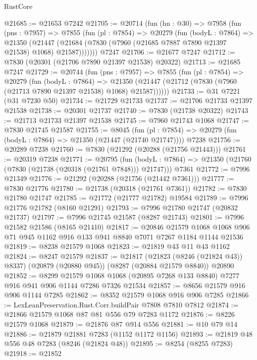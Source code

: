 \begin{lexlean}{RustCore}
\begin{coremodule}
@21685 := @21653 @7242
@21705 := @20714
    (fun (hn : @30) =>
    @7958
      (fun (pns : @7957) =>
      @7855
        (fun (pl : @7854) =>
        @20279
          (fun (bodyL : @7864) =>
          @21350
            (@21447 (@21684 (@7830 (@7960 (@21685 @7887 @7890 @21397 @21538) @1068) @21587)))))))
    @7247
@21706 := @21677 @7247
@21712 := @7830 (@20301 (@21706 @7890 @21397 @21538) @20322)
@21713 := @21685 @7247
@21729 := @20744
    (fun (pns : @7957) =>
    @7855
      (fun (pl : @7854) =>
      @20279
        (fun (bodyL : @7864) =>
        @21350 (@21447 (@21712 (@7830 (@7960 (@21713 @7890 @21397 @21538) @1068) @21587))))))
@21733 := @31 @7221 (@31 @7230 @50)
@21734 := @21729 @21733
@21737 := @21706 @21733 @21397 @21538
@21738 := @20301 @21737
@21740 := @7830 (@21738 @20322)
@21743 := @21713 @21733 @21397 @21538
@21745 := @7960 @21743 @1068
@21747 := @7830 @21745 @21587
@21755 := @8045
    (fun (pl : @7854) => @20279 (fun (bodyL : @7864) => @21350 (@21447 (@21740 @21747))))
    @7238
@21756 := @20289 @7238
@21760 := @7830 (@21292 (@20288 (@21756 @21443)))
@21761 := @20319 @7238
@21771 := @20795
    (fun (bodyL : @7864) => @21350 (@21760 (@7830 (@21738 (@20318 (@21761 @7848))) @21747)))
    @7361
@21772 := @7996 @21349
@21776 := @21292 (@20288 (@21756 (@21442 @7361)))
@21777 := @7830 @21776
@21780 := @21738 (@20318 (@21761 @7361))
@21782 := @7830 @21780 @21747
@21785 := @21772 (@21777 @21782) @19584
@21789 := @7996 @21776 @21782 (@8160 @21291)
@21793 := @7996 @21780 @21747 (@20832 @21737)
@21797 := @7996 @21745 @21587 (@8287 @21743)
@21801 := @7996 @21582 @21586 (@8165 @21410)
@21817 := @20846
    @21579
    @1068
    @1068
    @906
    @71
    @945
    @1162
    @916
    @133
    @941
    @8840
    @7071
    @7267
    @1184
    @1144
    @21536
@21819 := @8238 @21579 @1068
@21823 := @21819 @43 @11 @43 @1162
@21824 := @8247 @21579
@21837 := @21817
    (@21823 (@8246 (@21824 @43)) @8337)
    (@20879 (@20880 @945))
    (@8287 (@20884 @21579 @8840))
    @20890
@21852 := @8299
    @21579
    @1068
    @1068
    (@20895 @7268 @133 @8840)
    @7277
    @916
    @941
    @906
    @1144
    @7286
    @7326
    @21534
@21857 := @8656 @21579 @916 @906 @1144 @7285
@21862 := @8352 @21579 @1068 @916 @906 @7285
@21866 := LexLeanPreservation.Rust.Corr.buildPair @7808 @7810 @7812
@21874 := @21866 @21579 @1068 @87 @81 @556 @79 @7283 @1172
@21876 := @8226 @21579 @1068
@21879 := @21876 @87 @914 @556
@21881 := @10 @79 @14
@21886 := @21879 @21881 @7283 (@1152 @1172 @1156)
@21893 := @21819 @48 @556 @48 @7283 (@8246 (@21824 @48))
@21895 := @8254 (@8255 @7283)
@21918 := @21852

\end{coremodule}
\end{lexlean}
